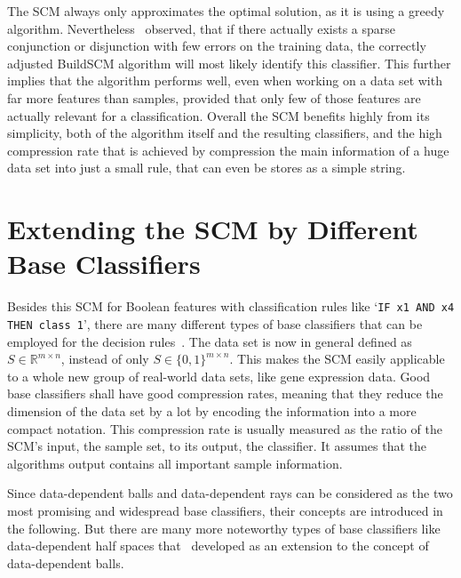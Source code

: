 The SCM always only approximates the optimal solution, as it is using a greedy algorithm.
Nevertheless~\cite{marchand02} observed, that if there actually exists a sparse conjunction or disjunction with few errors on the training data,
the correctly adjusted BuildSCM algorithm will most likely identify this classifier.
This further implies that the algorithm performs well, even when working on a data set with far more features than samples,
provided that only few of those features are actually relevant for a classification.
Overall the SCM benefits highly from its simplicity, both of the algorithm itself and the resulting classifiers,
and the high compression rate that is achieved by compression the main information of a huge data set into
just a small rule, that can even be stores as a simple string.

\section{Extending the SCM by Different Base Classifiers}\label{sec:baseClassifiers}

Besides this SCM for Boolean features with classification rules like `\texttt{IF x1 AND x4 THEN class 1}',
there are many different types of base classifiers that can be employed for the decision rules~\citep{kestler11}.
The data set is now in general defined as \(S \in \mathbb{R}^{m \times n}\), instead of only \(S \in \lbrace0,1\rbrace^{m \times n}\).
This makes the SCM easily applicable to a whole new group of real-world data sets, like gene expression data.
Good base classifiers shall have good compression rates,
meaning that they reduce the dimension of the data set by a lot by encoding the information into a more compact notation.
This compression rate is usually measured as the ratio of the SCM's input, the sample set, to its output, the classifier.
It assumes that the algorithms output contains all important sample information.

Since data-dependent balls and data-dependent rays can be considered as the two most promising and widespread base classifiers,
their concepts are introduced in the following.
But there are many more noteworthy types of base classifiers like data-dependent half spaces 
that~\cite{marchand03} developed as an extension to the concept of data-dependent balls.

